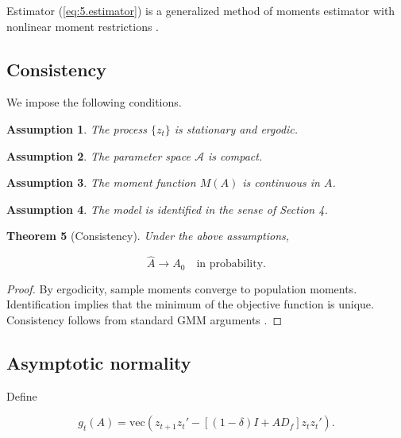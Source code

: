 \documentclass[12pt]{article}
\numberwithin{equation}{section}
\newtheorem{theorem}{Theorem}[section]
\newtheorem{assumption}[theorem]{Assumption}
\begin{document}
Estimator (\ref{eq:5.estimator}) is a generalized method of moments
estimator with nonlinear moment restrictions
\citep{hansen1982gmm, newey1994large}.

\subsection{Consistency}

We impose the following conditions.

\begin{assumption}
The process $\{z_t\}$ is stationary and ergodic.
\end{assumption}

\begin{assumption}
The parameter space $\mathcal A$ is compact.
\end{assumption}

\begin{assumption}
The moment function $M(A)$ is continuous in $A$.
\end{assumption}

\begin{assumption}
The model is identified in the sense of Section 4.
\end{assumption}

\begin{theorem}[Consistency]
Under the above assumptions,

\begin{equation}
\hat A
\to
A_0
\quad
\text{in probability}.
\label{eq:5.consistency}
\end{equation}

\end{theorem}

\begin{proof}
By ergodicity, sample moments converge to population moments.
Identification implies that the minimum of the objective function is unique.
Consistency follows from standard GMM arguments
\citep{newey1994large}.
\end{proof}

\subsection{Asymptotic normality}

Define

\begin{equation}
g_t(A)
=
\mathrm{vec}
\left(
z_{t+1} z_t'
-
[(1-\delta) I + A D_f] z_t z_t'
\right).
\label{eq:5.gt}
\end{equation}
\end{document}
